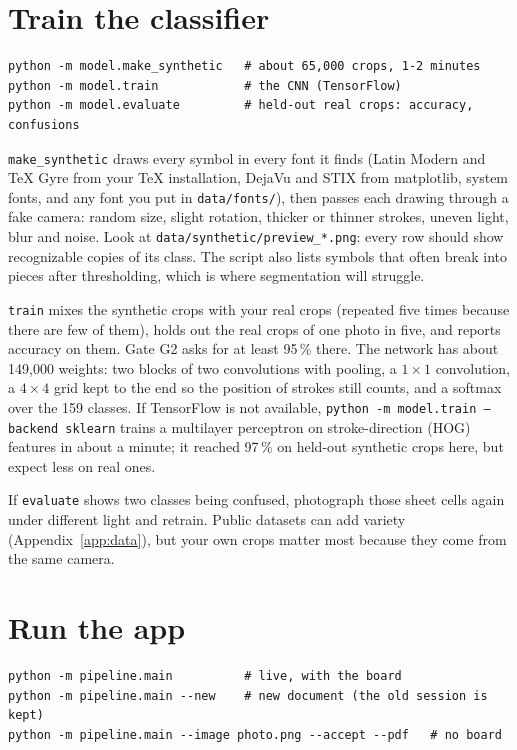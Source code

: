\documentclass[11pt]{article}
\newcommand{\cmd}[1]{\texttt{#1}}
\begin{document}
\section{Train the classifier}
\label{sec:train}

\begin{lstlisting}
python -m model.make_synthetic   # about 65,000 crops, 1-2 minutes
python -m model.train            # the CNN (TensorFlow)
python -m model.evaluate         # held-out real crops: accuracy, confusions
\end{lstlisting}

\cmd{make\_synthetic} draws every symbol in every font it finds (Latin Modern and \TeX{} Gyre from
your \TeX{} installation, DejaVu and STIX from matplotlib, system fonts, and any font you put in
\cmd{data/fonts/}), then passes each drawing through a fake camera: random size, slight rotation,
thicker or thinner strokes, uneven light, blur and noise. Look at
\cmd{data/synthetic/preview\_*.png}: every row should show recognizable copies of its class. The
script also lists symbols that often break into pieces after thresholding, which is where
segmentation will struggle.

\cmd{train} mixes the synthetic crops with your real crops (repeated five times because there are
few of them), holds out the real crops of one photo in five, and reports accuracy on them. Gate G2
asks for at least 95\,\% there. The network has about 149{,}000 weights: two blocks of two
convolutions with pooling, a $1\times1$ convolution, a $4\times4$ grid kept to the end so the
position of strokes still counts, and a softmax over the 159 classes. If TensorFlow is not
available, \cmd{python -m model.train --backend sklearn} trains a multilayer perceptron on
stroke-direction (HOG) features in about a minute; it reached 97\,\% on held-out synthetic crops
here, but expect less on real ones.

If \cmd{evaluate} shows two classes being confused, photograph those sheet cells again under
different light and retrain. Public datasets can add variety (Appendix~\ref{app:data}), but your
own crops matter most because they come from the same camera.

\section{Run the app}

\begin{lstlisting}
python -m pipeline.main          # live, with the board
python -m pipeline.main --new    # new document (the old session is kept)
python -m pipeline.main --image photo.png --accept --pdf   # no board
\end{lstlisting}
\end{document}
